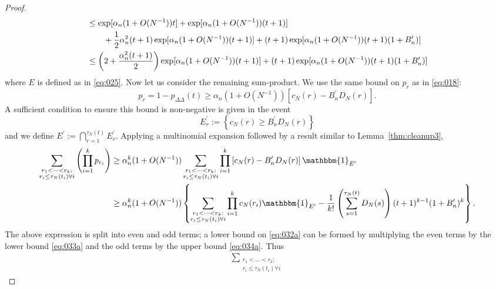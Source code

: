 \documentclass{article}
\newcommand{\1}[1]{\mathbbm{1}_{#1}}
\begin{document}
\begin{proof}
\begin{align}
&\leq \exp[ \alpha_n (1+O(N^{-1})) t ]
        + \exp[ \alpha_n (1+O(N^{-1})) (t+1) ]  \notag\\
    &\qquad+ \frac{1}{2} \alpha_n^2 (t+1)
        \exp[ \alpha_n (1+O(N^{-1})) (t+1) ]
        + (t+1) \exp[ \alpha_n (1+O(N^{-1})) (t+1) (1+B_n^\prime) ] \notag\\
&\leq \left( 2 + \frac{\alpha_n^2 (t+1)}{2} \right) 
        \exp[ \alpha_n (1+O(N^{-1})) (t+1) ] 
        + (t+1) \exp[ \alpha_n (1+O(N^{-1})) (t+1) (1+B_n^\prime) ] 
        \label{eq:034a}
\end{align}
where $E$ is defined as in \eqref{eq:025}.
Now let us consider the remaining sum-product. We use the same bound on $p_r$ as in \eqref{eq:018}:
\begin{equation}
p_r
= 1- p_{\Delta\Delta}(t) 
\geq \alpha_n (1+O(N^{-1})) 
        \left[ c_N(r) - B_n^\prime D_N(r) \right] .
\end{equation}
A sufficient condition to ensure this bound is non-negative is given in the event
\begin{equation}
E_r^\prime := \left\{ c_N(r) \geq B_n^\prime D_N(r) \right\}
\end{equation}
and we define $E^\prime := \bigcap_{r=1}^{\tau_N(t)} E_r^\prime$.
Applying a multinomial expansion followed by a result similar to Lemma~\ref{thm:cleanup3},
\begin{align}
\sum_{\substack{r_1 <\dots< r_k :\\ r_i \leq \tau_N(t_i) \forall i}}
        \left( \prod_{i=1}^k p_{r_i} \right)
&\geq \alpha_n^k (1+O(N^{-1})) \sum_{\substack{r_1 <\dots< r_k 
        :\\ r_i \leq \tau_N(t_i) \forall i}} \prod_{i=1}^k
        \left[ c_N(r) - B_n^\prime D_N(r) \right] \1{E^\prime} \notag\\
&\geq \alpha_n^k (1+O(N^{-1})) \left\{
        \sum_{\substack{r_1 <\dots< r_k :\\ r_i \leq \tau_N(t_i) \forall i}}
        \prod_{i=1}^k c_N(r_i) \1{E^\prime}
        - \frac{1}{k!} \left( \sum_{s=1}^{\tau_N(t)} D_N(s) \right)
        (t+1)^{k-1} (1+B_n^\prime)^k \right\} .
\end{align}
The above expression is split into even and odd terms; a lower bound on \eqref{eq:032a} can be formed by multiplying the even terms by the lower bound \eqref{eq:033a} and the odd terms by the upper bound \eqref{eq:034a}. 
Thus
\begin{align}
\sum_{\substack{r_1 <\dots< r_k :\\ r_i \leq \tau_N(t_i) \forall i}}

\end{align}
\end{proof}
\end{document}
